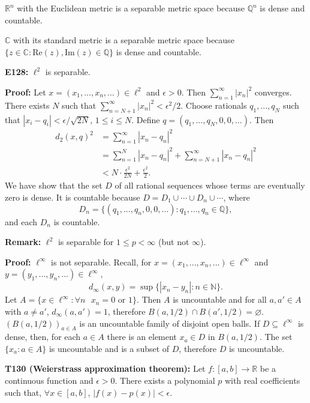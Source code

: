 \documentclass[twocolumn,10pt]{article}
\begin{document}
$\mathbb{R}^n$ with the Euclidean metric is a separable metric space because $\mathbb{Q}^n$ is dense and countable.

$\mathbb{C}$ with its standard metric is a separable metric space because $\{z\in\mathbb{C} : \text{Re}(z),\text{Im}(z)\in\mathbb{Q}\}$ is dense and countable.
\color{black}

\textbf{E128:} $\ell^2$ is separable.

\color{red}
\textbf{Proof:} Let $x=(x_1,...,x_n,...)\in\ell^2$ and $\epsilon>0$. Then $\sum_{n=1}^{\infty}|x_n|^2$ converges. There exists $N$ such that $\sum_{n=N+1}^{\infty}|x_n|^2<\epsilon^2/2$. Choose rationals $q_1,...,q_N$ such that $|x_i-q_i|<\epsilon/\sqrt{2N}$, $1\leq i\leq N$. Define $q=(q_1,...,q_N,0,0,...)$. Then
\begin{align*}
    d_2(x,q)^2 &= \sum_{n=1}^{\infty} |x_n-q_n|^2\\
    &= \sum_{n=1}^N |x_n-q_n|^2 + \sum_{n=N+1}^{\infty} |x_n-q_n|^2\\
    &< N\cdot\frac{\epsilon^2}{2N} + \frac{\epsilon^2}{2}.
\end{align*}
We have show that the set $D$ of all rational sequences whose terms are eventually zero is dense. It is countable because $D=D_1\cup \cdots \cup D_n \cup \cdots$, where
\begin{equation*}
    D_n = \{(q_1,...,q_n,0,0,...) : q_1,...,q_n\in\mathbb{Q}\},
\end{equation*}
and each $D_n$ is countable.
\color{black}

\textbf{Remark:} $\ell^2$ is separable for $1\leq p<\infty$ (but not $\infty$).

\color{red}
\textbf{Proof:} $\ell^{\infty}$ is not separable. Recall, for $x=(x_1,...,x_n,...)\in\ell^{\infty}$ and $y=(y_1,...,y_n,...)\in\ell^{\infty}$,
\begin{equation*}
    d_{\infty}(x,y) = \sup\{|x_n-y_n| : n\in\mathbb{N}\}.
\end{equation*}
Let $A=\{x\in\ell^{\infty} : \forall n \text{ } x_n=0 \text{ or } 1\}$. Then $A$ is uncountable and for all $a,a'\in A$ with $a\neq a'$, $d_{\infty}(a,a')=1$, therefore $B(a,1/2)\cap B(a',1/2)=\varnothing$. $(B(a,1/2))_{a\in A}$ is an uncountable family of disjoint open balls. If $D\subseteq\ell^{\infty}$ is dense, then, for each $a\in A$ there is an element $x_a\in D$ in $B(a,1/2)$. The set $\{x_a:a\in A\}$ is uncountable and is a subset of $D$, therefore $D$ is uncountable.
\color{black}

\textbf{T130 (Weierstrass approximation theorem):} Let $f:[a,b]\to\mathbb{R}$ be a continuous function and $\epsilon>0$. There exists a polynomial $p$ with real coefficients such that, $\forall x\in[a,b]$, $|f(x)-p(x)|<\epsilon$.
\end{document}
